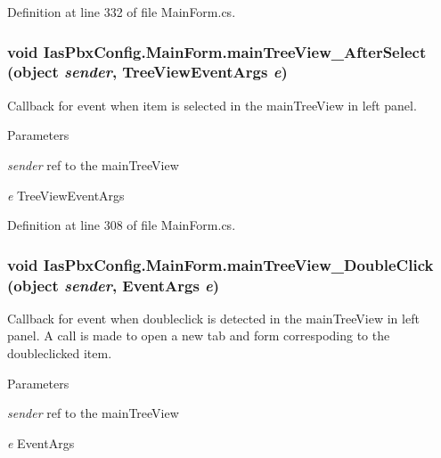 Definition at line 332 of file MainForm.cs.\hypertarget{class_ias_pbx_config_1_1_main_form_a4f46ed49282adeaa8154639534a2ec55}{
\subsubsection[{mainTreeView\_\-AfterSelect}]{\setlength{\rightskip}{0pt plus 5cm}void IasPbxConfig.MainForm.mainTreeView\_\-AfterSelect (object {\em sender}, \/  TreeViewEventArgs {\em e})}}
\label{class_ias_pbx_config_1_1_main_form_a4f46ed49282adeaa8154639534a2ec55}


Callback for event when item is selected in the mainTreeView in left panel. 
\begin{DoxyParams}{Parameters}
\item[{\em sender}]ref to the mainTreeView \item[{\em e}]TreeViewEventArgs \end{DoxyParams}


Definition at line 308 of file MainForm.cs.\hypertarget{class_ias_pbx_config_1_1_main_form_ae06266f74a2fe3984a178d3a036cc434}{
\subsubsection[{mainTreeView\_\-DoubleClick}]{\setlength{\rightskip}{0pt plus 5cm}void IasPbxConfig.MainForm.mainTreeView\_\-DoubleClick (object {\em sender}, \/  EventArgs {\em e})}}
\label{class_ias_pbx_config_1_1_main_form_ae06266f74a2fe3984a178d3a036cc434}


Callback for event when doubleclick is detected in the mainTreeView in left panel. A call is made to open a new tab and form correspoding to the doubleclicked item. 
\begin{DoxyParams}{Parameters}
\item[{\em sender}]ref to the mainTreeView \item[{\em e}]EventArgs \end{DoxyParams}


